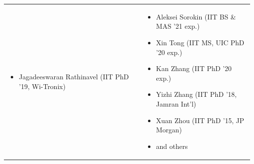 \documentclass[11pt,compress,xcolor={usenames,dvipsnames},aspectratio=169]{beamer}
\begin{document}
\begin{frame}
{\begin{tabular}{p{}p{}}
\begin{itemize}
			\item Jagadeeswaran Rathinavel (IIT PhD '19, Wi-Tronix)
			
			
			
			
		\end{itemize}
		
		&
		
		\begin{itemize}
			
			\setlength{\itemsep}{0ex}
			
			\item Aleksei Sorokin (IIT BS \& MAS '21 exp.)
			
			\item  Xin Tong (IIT MS, UIC PhD '20 exp.)
			
			\item Kan Zhang (IIT PhD '20 exp.)
			
			\item Yizhi Zhang (IIT PhD '18, Jamran Int'l)
			
			\item Xuan Zhou (IIT PhD '15, JP Morgan)
			
			\item and others
			
			
		\end{itemize}
	
		
	\end{tabular}
}

\end{frame}
\end{document}
